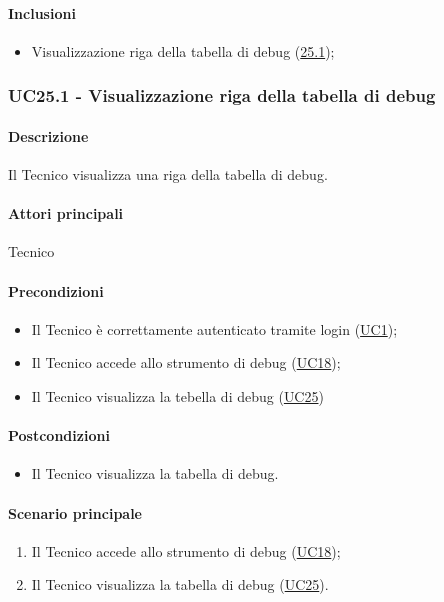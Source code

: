 \paragraph*{Inclusioni}
\begin{itemize}
    \item Visualizzazione riga della tabella di debug (\hyperref[UC25point1]{25.1});
\end{itemize}


\subsubsection{UC25.1 - Visualizzazione riga della tabella di debug}\label{UC25point1}
\paragraph*{Descrizione}
Il Tecnico visualizza una riga della tabella di debug. 

\paragraph*{Attori principali}
Tecnico

\paragraph*{Precondizioni}
\begin{itemize}
  \item Il Tecnico è correttamente autenticato tramite login (\hyperref[UC1]{UC1});
  \item Il Tecnico accede allo strumento di debug (\hyperref[UC18]{UC18});
  \item Il Tecnico visualizza la tebella di debug (\hyperref[UC25]{UC25})
\end{itemize}

\paragraph*{Postcondizioni}
\begin{itemize}
  \item Il Tecnico visualizza la tabella di debug.
\end{itemize}

\paragraph*{Scenario principale}
\begin{enumerate}
  \item Il Tecnico accede allo strumento di debug (\hyperref[UC18]{UC18});
  \item Il Tecnico visualizza la tabella di debug (\hyperref[UC25]{UC25}). 
\end{enumerate}

